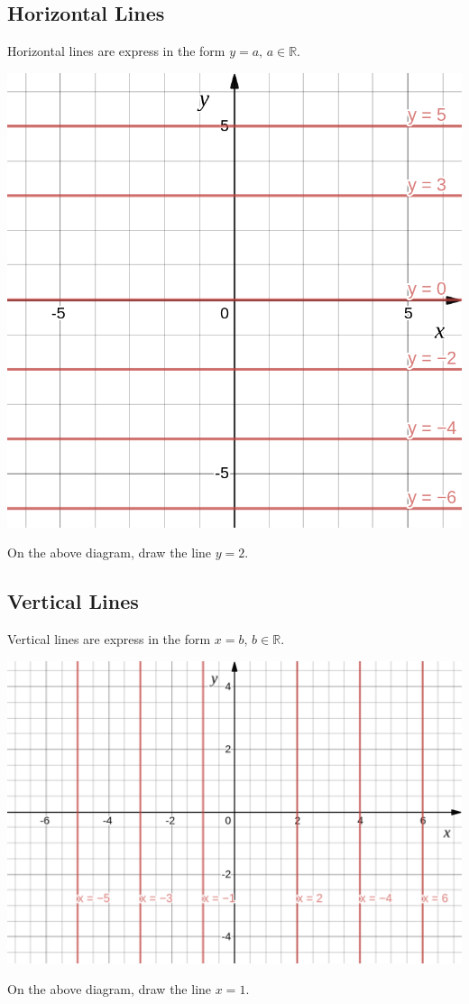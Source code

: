 \documentclass[a4paper,12pt]{article}
\begin{document}
\subsection{Horizontal Lines}
Horizontal lines are express in the form \(y=a,\,a\in\mathbb R\).
\begin{center}
\includegraphics[width=.99\textwidth]{hori.png}
\end{center}
On the above diagram, draw the line \(y=2\).
\newpage
\subsection{Vertical Lines}
Vertical lines are express in the form \(x=b,\,b\in\mathbb R\).
\begin{center}
\includegraphics[width=.99\textwidth]{vert.png}
\end{center}
On the above diagram, draw the line \(x=1\).
\end{document}
